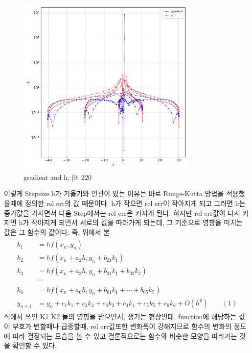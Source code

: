 \documentclass[11pt]{article}
\begin{document}
\begin{figure}[!ht]
  \centering
  \includegraphics[width=0.8\textwidth]{xandhs5.pdf}
  \caption{gradient and h, [0: 220}
\end{figure} 

이렇게 Stepsize h가 기울기와 연관이 있는 이유는 바로 Runge-Kutta 방법을 적용했을때에 정의한 rel err의 값 때문이다. h가 작으면 rel err이 작아지게 되고 그러면 h는 증가값을 가지면서 다음 Step에서는 rel err은 커지게 된다. 하지만 rel err값이 다시 커지면 h가 작아지게 되면서 서로의 값을 따라가게 되는데, 그 기준으로 영향을 미치는 값은 그 함수의 값이다. 즉, 위에서 본
\begin{equation}
\begin{split}
\begin{aligned}
k_1 &= h f(x_n, y_n) \\
k_2 &= h f(x_n + a_2 h, y_n + b_{21} k_1) \\
k_3 &= h f(x_n + a_3 h, y_n + b_{31} k_1 + b_{32} k_2) \\
    & \cdots \\
k_6 &= h f(x_n + a_6 h, y_n + b_{61} k_1 + \cdots + b_{65} k_5) \\
y_{n + 1} &= y_n + c_1 k_1 + c_2 k_2 + c_3 k_3 + c_4 k_4 + c_5 k_5 + c_6 k_6 + O(h^6)
\qquad (1)
\end{aligned}
\end{split}
\end{equation}
식에서 쓰인 K1 K2 들의 영향을 받으면서, 생기는 현상인데, function에 해당하는 값이 부호가 변할때나 급증할때, rel err값또한 변화폭이 강해지므로 함수의 변화의 정도에 따라 결정되는 모습을 볼 수 있고 결론적으로는 함수와 비슷한 모양을 따라가는 것을 확인할 수 있다.
\pagebreak
\end{document}
